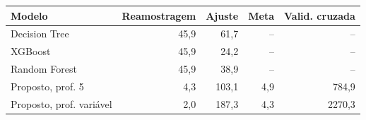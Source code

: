 \begin{tabular}{lrrrr}
\hline
\textbf{Modelo} & \textbf{Reamostragem} & \textbf{Ajuste} & \textbf{Meta} & \textbf{Valid. cruzada} \\ \hline
Decision Tree & 45,9 & 61,7 & -- & -- \\
XGBoost & 45,9 & 24,2 & -- & -- \\
Random Forest & 45,9 & 38,9 & -- & -- \\
Proposto, prof. 5 & 4,3 & 103,1 & 4,9 & 784,9 \\
Proposto, prof. variável & 2,0 & 187,3 & 4,3 & 2270,3 \\
\hline
\end{tabular}
